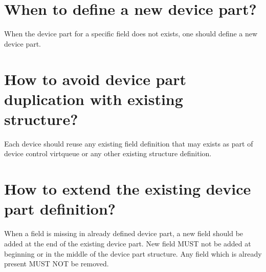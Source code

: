 \section{When to define a new device part?}\label{sec:Creating New Device Types or Extending the Device / When to define a new device part?}
When the device part for a specific field does not exists, one should
define a new device part.

\section{How to avoid device part duplication with existing structure?}\label{sec:Creating New Device Types or Extending the Device / How to avoid device part duplication with existing structure?}
Each device should reuse any existing field definition that may exists as part
of device control virtqueue or any other existing structure definition.

\section{How to extend the existing device part definition?}\label{sec:Creating New Device Types or Extending the Device / How to extend the existing device part definition?}

When a field is missing in already defined device part, a new field should be added at
the end of the existing device part. New field MUST not be added at beginning or in
the middle of the device part structure. Any field which is already present MUST NOT
be removed.
